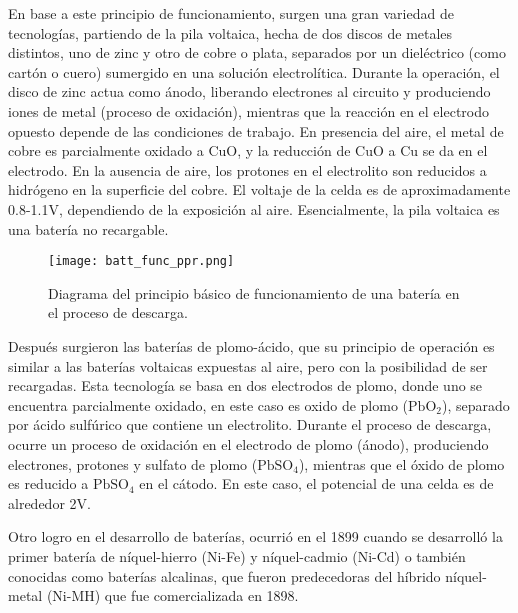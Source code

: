\noindent En base a este principio de funcionamiento, surgen una gran variedad
de tecnologías, partiendo de la pila voltaica, hecha de dos discos de metales
distintos, uno de zinc y otro de cobre o plata, separados por un dieléctrico
(como cartón o cuero) sumergido en una solución electrolítica. Durante la
operación, el disco de zinc actua como ánodo, liberando electrones al circuito y
produciendo iones de metal (proceso de oxidación), mientras que la reacción en
el electrodo opuesto depende de las condiciones de trabajo. En presencia del
aire, el metal de cobre es parcialmente oxidado a CuO, y la reducción de CuO a
Cu se da en el electrodo. En la ausencia de aire, los protones en el electrolito
son reducidos a hidrógeno en la superficie del cobre. El voltaje de la celda es
de aproximadamente 0.8-1.1V, dependiendo de la exposición al aire. 
Esencialmente, la pila voltaica es una batería no recargable.

\begin{figure}[h!]
    \begin{center}
	\texttt{[image: batt\_func\_ppr.png]}
    \end{center}
    \caption{Diagrama del principio básico de funcionamiento de una bater\'ia 
        en el proceso de descarga.}
    \label{batt_wk_ppl}
\end{figure}

\noindent Despu\'es surgieron las baterías de plomo-ácido, que su principio
de operaci\'on es similar a las baterías voltaicas expuestas al aire, pero con
la posibilidad de ser recargadas. Esta tecnología se basa en dos electrodos de
plomo, donde uno se encuentra parcialmente oxidado, en este caso es  oxido de 
plomo ($\mathrm{PbO_2}$), separado por \'acido sulf\'urico que contiene un 
electrolito. Durante el proceso de descarga, ocurre un proceso de oxidaci\'on 
en el electrodo de plomo (\'anodo), produciendo electrones, protones y sulfato 
de plomo ($\mathrm{PbSO_4}$), mientras que el \'oxido de plomo es reducido a
$\mathrm{PbSO_4}$ en el cátodo. En este caso, el potencial de una celda es de
alrededor 2V.

\noindent Otro logro en el desarrollo de baterías, ocurrió en el 1899 cuando se
desarrolló la primer batería de n\'iquel-hierro (Ni-Fe) y n\'iquel-cadmio
(Ni-Cd) o también conocidas como baterías alcalinas, que fueron predecedoras del
híbrido n\'iquel-metal (Ni-MH) que fue comercializada en 1898.

